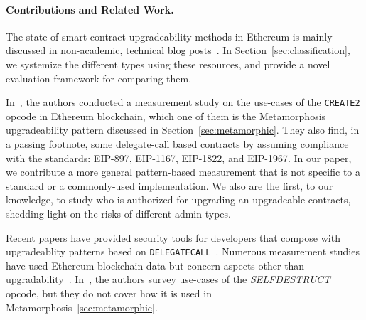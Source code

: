 \paragraph{Contributions and Related Work.} 
The state of smart contract upgradeability methods in Ethereum is mainly discussed in non-academic, technical blog posts~\cite{openzeppelinPost,tobBlogPost}. In Section~\ref{sec:classification}, we systemize the different types using these resources, and provide a novel evaluation framework for comparing them.

In~\cite{frowisnot}, the authors conducted a measurement study on the use-cases of the \texttt{CREATE2} opcode in Ethereum blockchain, which one of them is the Metamorphosis upgradeability pattern discussed in Section~\ref{sec:metamorphic}. They also find, in a passing footnote, some delegate-call based contracts by assuming compliance with the standards: EIP-897, EIP-1167, EIP-1822, and EIP-1967. In our paper, we contribute a more general pattern-based measurement that is not specific to a standard or a commonly-used implementation. We also are the first, to our knowledge, to study who is authorized for upgrading an upgradeable contracts, shedding light on the risks of different admin types.

Recent papers have provided security tools for developers that compose with upgradeablity patterns based on  \texttt{DELEGATECALL}~\cite{rodler2021evmpatch,perez2022dissimilar}. Numerous measurement studies have used Ethereum blockchain data but concern aspects other than upgradability~\cite{perez2019broken,chen2017adaptive,reijsbergen2021transaction,victor2019measuring,pinna2019massive,he2020characterizing}. In~\cite{chen2021smart}, the authors survey use-cases of the \textit{SELFDESTRUCT} opcode, but they do not cover how it is used in Metamorphosis~\ref{sec:metamorphic}.



